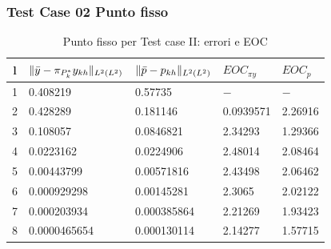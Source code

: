\documentclass{beamer}
\theoremstyle{definition}
\theoremstyle{remark}
\theoremstyle{plain}
\theoremstyle{definition}
\DeclarePairedDelimiter{\norma}{\lVert}{\rVert}
\begin{document}
\begin{frame}
\frametitle{Test Case 02 Punto fisso}
\begin{table}
\caption{Punto fisso per Test case II: errori e EOC }
\label{puntofissoIIbis}
\centering

\begin{tabular}{cllll}
\toprule
{l}           &  {$ \norma{\bar{y}-\pi_{P^*_k}y_{kh}}_{L^2(L^2)} $} &  {$ \norma{\bar{p}-p_{kh}}_{L^2(L^2)} $} &  {$ EOC_{\pi y} $} &  {$ EOC_p $} \\
\midrule
1            &  0.408219 &  0.57735 &  {$-$} &  {$-$} \\
2            &  0.428289 &  0.181146 &  0.0939571 &  2.26916 \\
3            &  0.108057  &  0.0846821 &  2.34293 &  1.29366 \\
4            &  0.0223162  &  0.0224906 &  2.48014 &  2.08464 \\
5            &  0.00443799 &  0.00571816 &  2.43498 &  2.06462 \\
6            &  0.000929298 &  0.00145281 &  2.3065 &  2.02122 \\
7            &  0.000203934 &  0.000385864 &  2.21269 &  1.93423 \\      
8            &  0.0000465654 &  0.000130114 &  2.14277 &  1.57715 \\
\bottomrule
\end{tabular}              
\end{table}

\end{frame}
\end{document}
